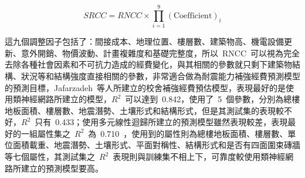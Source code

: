     \begin{equation}SRCC = RNCC \times \prod_{i=1}^9 (\text{Coefficient})_i \end{equation} 

這九個調整因子包括了：間接成本、地理位置、樓層數、建築物高、機電設備更新、意外開銷、物價波動、計畫複雜度和基礎完整度，所以~RNCC~可以視為完全去除各種社會因素和不可抗力造成的經費變化，與其相關的參數就只剩下建築物結構、狀況等和結構強度直接相關的參數，非常適合做為耐震能力補強經費預測模型的預測目標，Jafarzadeh~等人所建立的校舍補強經費預估模型，表現最好的是使用類神經網路所建立的模型，$R^2$~可以達到~0.842，使用了~5~個參數，分別為總樓地板面積、樓層數、地震潛勢、土壤形式和結構形式，但是其測試集的表現較不好，$R^2$~只有~0.433；使用多元線性迴歸所建立的預測模型雖然表現較差，表現最好的一組屬性集之~$R^2$~為~0.710~，使用到的屬性則為總樓地板面積、樓層數、單位面積載重、地震潛勢、土壤形式、平面對稱性、結構形式和是否有四面圍束磚牆等七個屬性，其測試集之~$R^2$~表現則與訓練集不相上下，可靠度較使用類神經網路所建立的預測模型要高。


